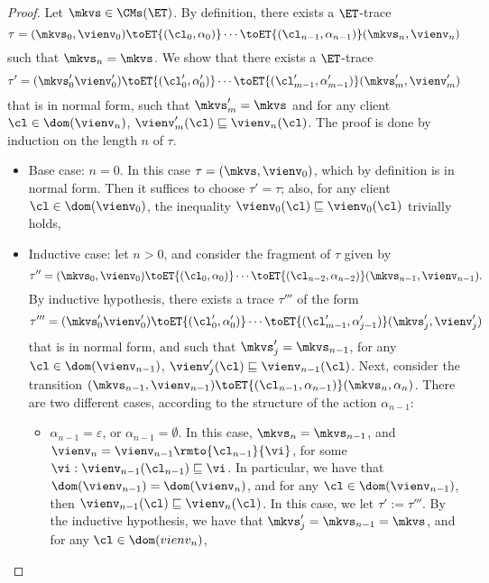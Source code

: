 \begin{proof}
Let $\mkvs \in \CMs(\ET)$. By definition, there exists a $\ET$-trace  
\begin{equation}
\label{eq:normalform.sequence}
\tau = (\mkvs_{0}, \vienv_{0}) \toET{(\cl_0, \alpha_0)} \cdots \toET{(\cl_{n-1}, \alpha_{n-1})} (\mkvs_n, \vienv_{n})
\end{equation}
such that $\mkvs_{n} = \mkvs$. 
We show that there exists a $\ET$-trace 
\[
\tau' = (\mkvs'_{0} \vienv'_{0}) \toET{(\cl'_{0}, \alpha'_{0})} \cdots \toET{(\cl'_{m-1}, \alpha'_{m-1})} (\mkvs'_{m}, \vienv'_{m})
\]
that is in normal form, such that $\mkvs'_{m} = \mkvs$ and for any client $\cl \in \dom(\vienv_{n})$, $\vienv'_{m}(\cl) \sqsubseteq 
\vienv_{n}(\cl)$. The proof is done by induction on the length $n$ of $\tau$. 
\begin{itemize}
\item Base case: $n = 0$. In this case $\tau = (\mkvs, \vienv_{0})$, which by definition is in normal form. Then it 
suffices to choose $\tau' = \tau$; also, for any client $\cl \in \dom(\vienv_{0})$, the inequality $\vienv_{0}(\cl) \sqsubseteq 
\vienv_{0}(\cl)$ trivially holds, 
\item Inductive case: let $n > 0$, and consider the fragment of $\tau$ given by 
\[
\tau'' = (\mkvs_{0}, \vienv_{0}) \toET{(\cl_0, \alpha_0)} \cdots \toET{(\cl_{n-2}, \alpha_{n-2})} (\mkvs_{n-1}, \vienv_{n-1}).
\]
By inductive hypothesis, there exists a trace $\tau'''$ of the form 
\[
\tau''' = (\mkvs'_{0} \vienv'_{0}) \toET{(\cl'_{0}, \alpha'_{0})} \cdots \toET{(\cl'_{m-1}, \alpha'_{j-1})} (\mkvs'_{j}, \vienv'_{j})
\]
that is in normal form, and such that $\mkvs'_{j} = \mkvs_{n-1}$, for any $\cl \in \dom(\vienv_{n-1})$, $\vienv'_{j}(\cl) \sqsubseteq 
\vienv_{n-1}(\cl)$. Next, consider the transition $(\mkvs_{n-1}, \vienv_{n-1}) \toET{(\cl_{n-1}, \alpha_{n-1})} (\mkvs_{n}, \alpha_{n})$. 
There are two different cases, according to the structure of the action $\alpha_{n-1}$: 
\begin{itemize}
\item $\alpha_{n-1} = \varepsilon$, or $\alpha_{n-1} = \emptyset$. In this case, $\mkvs_{n} = \mkvs_{n-1}$, and $\vienv_{n} = \vienv_{n-1}\rmto{\cl_{n-1}}{\vi}$, 
for some $\vi : \vienv_{n-1}(\cl_{n-1}) \sqsubseteq \vi$. In particular, we have that $\dom(\vienv_{n-1}) = \dom(\vienv_{n})$, 
and for any $\cl \in \dom(\vienv_{n-1})$, then $\vienv_{n-1}(\cl) \sqsubseteq \vienv_{n}(\cl)$. In this case, we let $\tau' := \tau'''$. 
By the inductive hypothesis, we have that $\mkvs'_{j} = \mkvs_{n-1} = \mkvs$, and for any $\cl \in \dom(vienv_{n})$, 

\end{itemize}
\end{itemize}
\end{proof}
